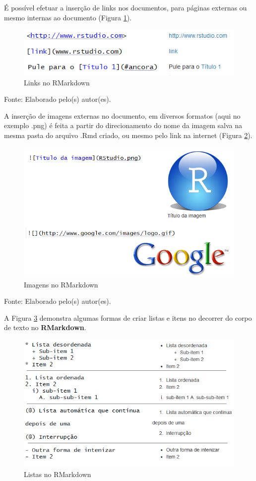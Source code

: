 \documentclass[12pt,brazil,oneside]{book}
\begin{document}
É possível efetuar a inserção de links nos documentos, para páginas externas ou mesmo internas ao documento (Figura \ref{fig:rmarklinks}).

\begin{figure}[H]

{\centering \includegraphics[width=0.7\linewidth]{rmarklinks} 

}

\caption{Links no RMarkdown}\label{fig:rmarklinks}
\end{figure}

Fonte: Elaborado pelo(s) autor(es).

A inserção de imagens externas no documento, em diversos formatos (aqui no exemplo .png) é feita a partir do direcionamento do nome da imagem salva na mesma pasta do arquivo .Rmd criado, ou mesmo pelo link na internet (Figura \ref{fig:rmarkimg}).

\begin{figure}[H]

{\centering \includegraphics[width=0.7\linewidth]{rmarkimg} 

}

\caption{Imagens no RMarkdown}\label{fig:rmarkimg}
\end{figure}

Fonte: Elaborado pelo(s) autor(es).

A Figura \ref{fig:rmarklist} demonstra algumas formas de criar listas e itens no decorrer do corpo de texto no \textbf{RMarkdown}.

\begin{figure}[H]

{\centering \includegraphics[width=0.7\linewidth]{rmarklist} 

}

\caption{Listas no RMarkdown}\label{fig:rmarklist}
\end{figure}
\end{document}
